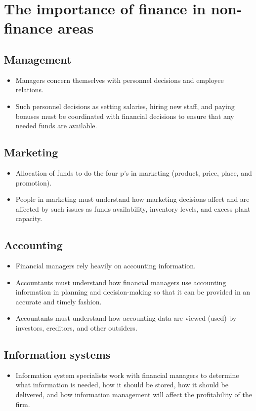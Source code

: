 \documentclass{article}
\begin{document}
\section{The importance of finance in non-finance areas}
\subsection{Management}
\begin{itemize}
    \item Managers concern themselves with personnel decisions and employee relations.
    \item Such personnel decisions as setting salaries, hiring new staff, and paying bonuses must be coordinated with financial decisions to ensure that any needed funds are available.
\end{itemize}
\subsection{Marketing}
\begin{itemize}
    \item Allocation of funds to do the four p's in marketing (product, price, place, and promotion).
    \item People in marketing must understand how marketing decisions affect and are affected by such issues as funds availability, inventory levels, and excess plant capacity.
\end{itemize}
\subsection{Accounting}
\begin{itemize}
    \item Financial managers rely heavily on accounting information.
    \item Accountants must understand how financial managers use accounting information in planning and decision-making so that it can be provided in an accurate and timely fashion.
    \item Accountants must understand how accounting data are viewed (used) by investors, creditors, and other outsiders. 
\end{itemize}
\subsection{Information systems}
\begin{itemize}
    \item Information system specialists work with financial managers to determine what information is needed, how it should be stored, how it should be delivered, and how information management will affect the profitability of the firm.
\end{itemize}
\end{document}
